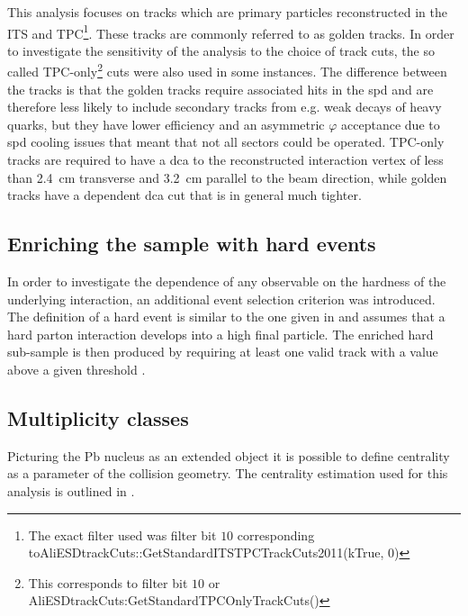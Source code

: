 This analysis focuses on tracks which are primary particles reconstructed in the ITS and TPC\footnote{The exact filter used was filter bit $10$ corresponding to\newline AliESDtrackCuts::GetStandardITSTPCTrackCuts2011(kTrue, 0)}. These tracks are commonly referred to as \gls{golden} tracks. In order to investigate the sensitivity of the analysis to the choice of track cuts, the so called \gls{TPC-only}\footnote{This corresponds to filter bit $10$ or  AliESDtrackCuts:GetStandardTPCOnlyTrackCuts()} cuts were also used in some instances. The difference between the tracks is that the golden tracks require associated hits in the \gls{spd} and are therefore less likely to include secondary tracks from e.g. weak decays of heavy quarks, but they have lower efficiency and an asymmetric $\varphi$ acceptance due to \gls{spd} cooling issues that meant that not all sectors could be operated. \gls{TPC-only} tracks are required to have a  \gls{dca} to the reconstructed interaction vertex of less than \SI{2.4}{cm} transverse and \SI{3.2}{cm} parallel to the beam direction, while golden tracks have a \pt dependent \gls{dca} cut that is in general much tighter.

\subsection{Enriching the sample with hard events}
\label{sec:enrich_hard}

In order to investigate the dependence of any observable on the hardness of the underlying interaction, an additional event selection criterion was introduced.
The definition of a hard event is similar to the one given in \cite{Acosta2002} and assumes that a hard parton interaction develops into a high \pt final particle.
The enriched hard sub-sample is then produced by requiring at least one valid track with a \pt value above a given threshold \ptthresh. 

\subsection{Multiplicity classes}
\label{sec:mult_classes}
Picturing the \gls{Pb} nucleus as an extended object it is possible to define centrality as a parameter of the collision geometry. The centrality estimation used for this analysis is outlined in \cite{Morsch2013,ALICECollaboration2012}. 

